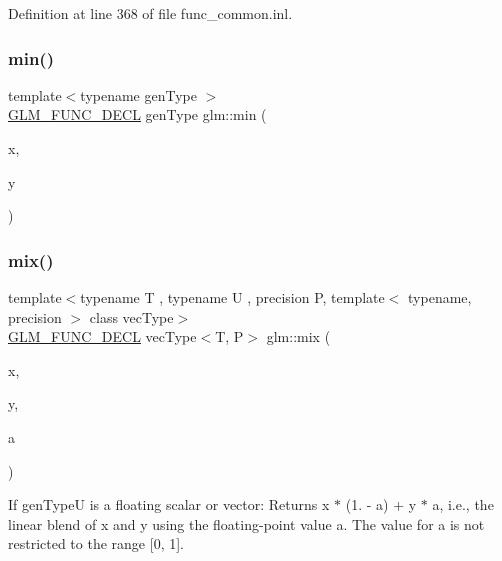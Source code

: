 Definition at line 368 of file func\+\_\+common.\+inl.

\mbox{\label{group__core__func__common_gac0f3dec634730c146c121a6517441c9a}} 
\subsubsection{\texorpdfstring{min()}{min()}\hspace{0.1cm}{\footnotesize\ttfamily [2/2]}}
{\footnotesize\ttfamily template$<$typename gen\+Type $>$ \\
\hyperlink{setup_8hpp_ab2d052de21a70539923e9bcbf6e83a51}{G\+L\+M\+\_\+\+F\+U\+N\+C\+\_\+\+D\+E\+CL} gen\+Type glm\+::min (\begin{DoxyParamCaption}\item[{gen\+Type const \&}]{x,  }\item[{typename gen\+Type\+::value\+\_\+type const \&}]{y }\end{DoxyParamCaption})}

\mbox{\label{group__core__func__common_gadccbaffe46f369cf1a96b2aef92cbfdd}} 
\subsubsection{\texorpdfstring{mix()}{mix()}\hspace{0.1cm}{\footnotesize\ttfamily [1/3]}}
{\footnotesize\ttfamily template$<$typename T , typename U , precision P, template$<$ typename, precision $>$ class vec\+Type$>$ \\
\hyperlink{setup_8hpp_ab2d052de21a70539923e9bcbf6e83a51}{G\+L\+M\+\_\+\+F\+U\+N\+C\+\_\+\+D\+E\+CL} vec\+Type$<$T, P$>$ glm\+::mix (\begin{DoxyParamCaption}\item[{vec\+Type$<$ T, P $>$ const \&}]{x,  }\item[{vec\+Type$<$ T, P $>$ const \&}]{y,  }\item[{vec\+Type$<$ U, P $>$ const \&}]{a }\end{DoxyParamCaption})}

If gen\+TypeU is a floating scalar or vector\+: Returns x $\ast$ (1. -\/ a) + y $\ast$ a, i.\+e., the linear blend of x and y using the floating-\/point value a. The value for a is not restricted to the range \mbox{[}0, 1\mbox{]}.

